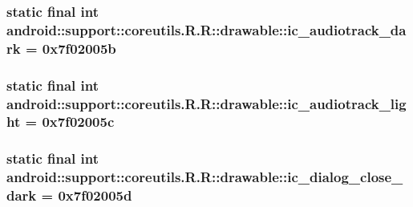 \hypertarget{classandroid_1_1support_1_1coreutils_1_1_r_1_1drawable_8957602d99b1c56730c2d1bc14d4dfb7}{
\subsubsection[{ic\_\-audiotrack\_\-dark}]{\setlength{\rightskip}{0pt plus 5cm}static final int android::support::coreutils.R.R::drawable::ic\_\-audiotrack\_\-dark = 0x7f02005b}}
\label{classandroid_1_1support_1_1coreutils_1_1_r_1_1drawable_8957602d99b1c56730c2d1bc14d4dfb7}


\hypertarget{classandroid_1_1support_1_1coreutils_1_1_r_1_1drawable_407e3bdc7799e9e2ea29a35dd354a272}{
\subsubsection[{ic\_\-audiotrack\_\-light}]{\setlength{\rightskip}{0pt plus 5cm}static final int android::support::coreutils.R.R::drawable::ic\_\-audiotrack\_\-light = 0x7f02005c}}
\label{classandroid_1_1support_1_1coreutils_1_1_r_1_1drawable_407e3bdc7799e9e2ea29a35dd354a272}


\hypertarget{classandroid_1_1support_1_1coreutils_1_1_r_1_1drawable_95fbc94f3183cb3a40e4adedb5dd4a89}{
\subsubsection[{ic\_\-dialog\_\-close\_\-dark}]{\setlength{\rightskip}{0pt plus 5cm}static final int android::support::coreutils.R.R::drawable::ic\_\-dialog\_\-close\_\-dark = 0x7f02005d}}
\label{classandroid_1_1support_1_1coreutils_1_1_r_1_1drawable_95fbc94f3183cb3a40e4adedb5dd4a89}


